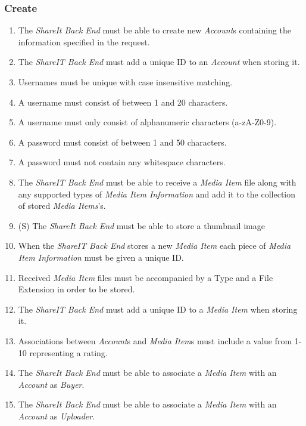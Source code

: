 \subsubsection{Create}
\begin{enumerate}[label=\textbf{FR-\twodigits*},resume]

\item The \textit{ShareIt Back End} must be able to create new \textit{Account}s containing the information specified in the request.

\item The \textit{ShareIT Back End} must add a unique ID to an \textit{Account} when storing it.

\item Usernames must be unique with case insensitive matching.

\item A username must consist of between 1 and 20 characters.

\item A username must only consist of alphanumeric characters (a-zA-Z0-9).

\item A password must consist of between 1 and 50 characters. 

\item A password must not contain any whitespace characters.

\item The \textit{ShareIT Back End} must be able to receive a \textit{Media Item} file along with any supported types of \textit{Media Item Information} and add it to the collection of stored \textit{Media Items}'s.

\item (S) The \textit{ShareIt Back End} must be able to store a thumbnail image

\item When the \textit{ShareIT Back End} stores a new \textit{Media Item} each piece of \textit{Media Item Information} must be given a unique ID.

\item Received \textit{Media Item} files must be accompanied by a Type and a File Extension in order to be stored.

\item The \textit{ShareIT Back End} must add a unique ID to a \textit{Media Item} when storing it.

\item Associations between \textit{Account}s and \textit{Media Item}s must include a value from 1-10 representing a rating.

\item The \textit{ShareIt Back End} must be able to associate a \textit{Media Item} with an \textit{Account} as \textit{Buyer}.

\item The \textit{ShareIt Back End} must be able to associate a \textit{Media Item} with an \textit{Account} as \textit{Uploader}.
\end{enumerate}

